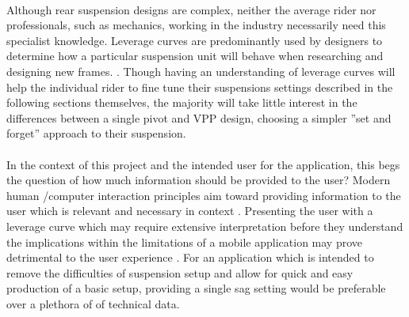 		\\
		Although rear suspension designs are complex, neither the average rider nor professionals, such as mechanics, working in the industry necessarily need this specialist knowledge. Leverage curves are predominantly used by designers to determine how a particular suspension unit will behave when researching and designing new frames. . Though having an understanding of leverage curves will help the individual rider to fine tune their suspensions settings described in the following sections themselves, the majority will take little interest in the differences between a single pivot and VPP design, choosing a simpler ”set and forget” approach to their suspension. 
		\\\\
		In the context of this project and the intended user for the application, this begs the question of how much information should be provided to the user? Modern human /computer interaction principles aim toward providing information to the user which is relevant and necessary in context . Presenting the user with a leverage curve which may require extensive interpretation before they understand the implications within the limitations of a mobile application may prove detrimental to the user experience . For an application which is intended to remove the difficulties of suspension setup and allow for quick and easy production of a basic setup, providing a single sag setting would be preferable over a plethora of of technical data.	
